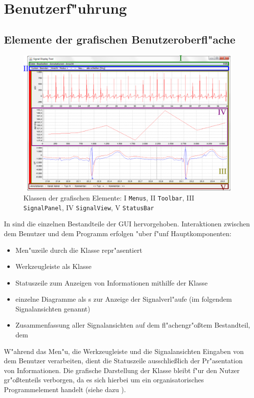 \section{Benutzerf"uhrung}

\subsection{Elemente der grafischen Benutzeroberfl"ache}

\begin{figure}[htb]
\centering
\includegraphics[width=\textwidth]{bilder/programm_ansicht.eps}
\caption[Klassen der grafischen Elemente]{Klassen der grafischen Elemente: I \texttt{Menus}, II \texttt{Toolbar}, III \texttt{SignalPanel}, IV \texttt{SignalView}, V \texttt{StatusBar}}
\label{pic:gui_elements_and_classes}
\end{figure}

In  sind die einzelnen Bestandteile der \ac{GUI} hervorgehoben.
Interaktionen zwischen dem Benutzer und dem Programm erfolgen "uber f"unf Hauptkomponenten:
\begin{itemize}
	\item Men"uzeile durch die Klasse  repr"asentiert
	\item Werkzeugleiste als Klasse 
	\item Statuszeile zum Anzeigen von Informationen mithilfe der Klasse 
	\item einzelne Diagramme als s zur Anzeige der Signalverl"aufe (im folgendem Signalansichten genannt)
	\item Zusammenfassung aller Signalansichten auf dem fl"achengr"o{\ss}tem Bestandteil, dem 
\end{itemize}
W"ahrend das Men"u, die Werkzeugleiste und die Signalansichten Eingaben von dem Benutzer verarbeiten, dient die Statuszeile ausschlie{\ss}lich der Pr"asentation von Informationen.
Die grafische Darstellung der Klasse  bleibt f"ur den Nutzer gr"o{\ss}tenteils verborgen, da es sich hierbei um ein organisatorisches Programmelement handelt (siehe dazu ).

